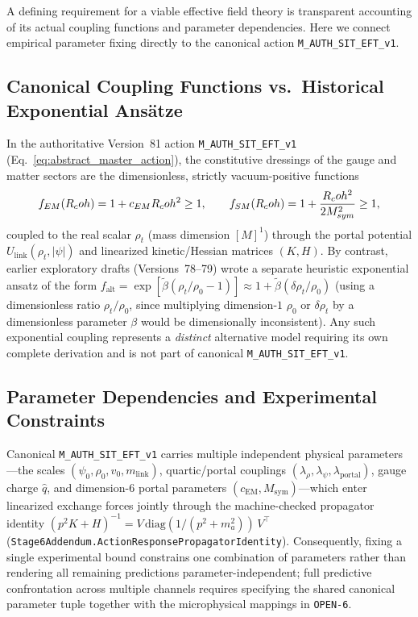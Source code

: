 A defining requirement for a viable effective field theory is transparent accounting of its actual coupling functions and parameter dependencies. Here we connect empirical parameter fixing directly to the canonical action \texttt{M\_AUTH\_SIT\_EFT\_v1}.

\subsection{Canonical Coupling Functions vs.\ Historical Exponential Ans\"atze}

In the authoritative Version~81 action \texttt{M\_AUTH\_SIT\_EFT\_v1} (Eq.~\eqref{eq:abstract_master_action}), the constitutive dressings of the gauge and matter sectors are the dimensionless, strictly vacuum-positive functions
\begin{equation}
f_{EM}(R_coh) = 1 + c_{EM}R_coh^2 \ge 1,
\qquad
f_{SM}(R_coh) = 1 + \frac{R_coh^2}{2 M_{sym}^2} \ge 1,
\end{equation}
coupled to the real scalar $\rho_t$ (mass dimension $[M]^1$) through the portal potential $U_{\mathrm{link}}(\rho_t, |\psi|)$ and linearized kinetic/Hessian matrices $(K, H)$. By contrast, earlier exploratory drafts (Versions~78--79) wrote a separate heuristic exponential ansatz of the form $f_{\mathrm{alt}} = \exp[\tilde{\beta}(\rho_t/\rho_0 - 1)] \approx 1 + \tilde{\beta}(\delta\rho_t/\rho_0)$ (using a dimensionless ratio $\rho_t/\rho_0$, since multiplying dimension-$1$ $\rho_0$ or $\delta\rho_t$ by a dimensionless parameter $\beta$ would be dimensionally inconsistent). Any such exponential coupling represents a \emph{distinct} alternative model requiring its own complete derivation and is not part of canonical \texttt{M\_AUTH\_SIT\_EFT\_v1}.

\subsection{Parameter Dependencies and Experimental Constraints}

Canonical \texttt{M\_AUTH\_SIT\_EFT\_v1} carries multiple independent physical parameters—the scales $(\psi_0, \rho_0, v_0, m_{\mathrm{link}})$, quartic/portal couplings $(\lambda_\rho, \lambda_\psi, \lambda_{\mathrm{portal}})$, gauge charge $\hat{q}$, and dimension-$6$ portal parameters $(c_{\mathrm{EM}}, M_{\mathrm{sym}})$—which enter linearized exchange forces jointly through the machine-checked propagator identity $(p^2 K + H)^{-1} = V\,\mathrm{diag}(1/(p^2+m_a^2))\,V^\top$ (\texttt{Stage6Addendum.\allowbreak{}ActionResponsePropagatorIdentity}). Consequently, fixing a single experimental bound constrains one combination of parameters rather than rendering all remaining predictions parameter-independent; full predictive confrontation across multiple channels requires specifying the shared canonical parameter tuple together with the microphysical mappings in \texttt{OPEN-6}.

